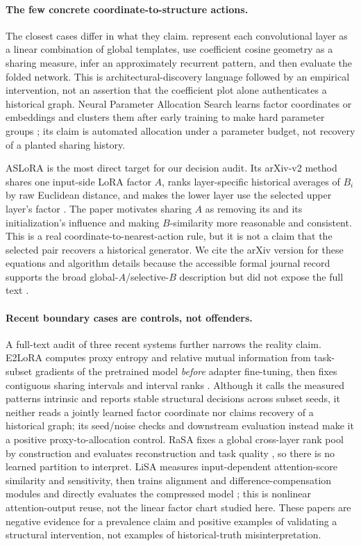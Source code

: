 \paragraph{The few concrete coordinate-to-structure actions.}
The closest cases differ in what they claim.  \citet{savarese2019learning}
represent each convolutional layer as a linear combination of global
templates, use coefficient cosine geometry as a sharing measure, infer an
approximately recurrent pattern, and then evaluate the folded network.  This
is architectural-discovery language followed by an empirical intervention,
not an assertion that the coefficient plot alone authenticates a historical
graph.  Neural Parameter Allocation Search learns factor coordinates or
embeddings and clusters them after early training to make hard parameter
groups \citep{plummer2022neural}; its claim is automated allocation under a
parameter budget, not recovery of a planted sharing history.

ASLoRA is the most direct target for our decision audit.  Its arXiv-v2 method
shares one input-side LoRA factor $A$, ranks layer-specific historical
averages of $B_i$ by raw Euclidean distance, and makes the lower layer use the
selected upper layer's factor \citep{hu2024aslorav2}.  The paper motivates
sharing $A$ as removing its and its initialization's influence and making
$B$-similarity more reasonable and consistent.  This is a real
coordinate-to-nearest-action rule, but it is not a claim that the selected
pair recovers a historical generator.  We cite the arXiv version for these
equations and algorithm details because the accessible formal journal record
supports the broad global-$A$/selective-$B$ description but did not expose
the full text \citep{hu2026aslora}.

\paragraph{Recent boundary cases are controls, not offenders.}
A full-text audit of three recent systems further narrows the reality claim.
E2LoRA computes proxy entropy and relative mutual information from
task-subset gradients of the pretrained model \emph{before} adapter
fine-tuning, then fixes contiguous sharing intervals and interval ranks
\citep{li2026e2lora}.  Although it calls the measured patterns intrinsic and
reports stable structural decisions across subset seeds, it neither reads a
jointly learned factor coordinate nor claims recovery of a historical graph;
its seed/noise checks and downstream evaluation instead make it a positive
proxy-to-allocation control.  RaSA fixes a global cross-layer rank pool by
construction and evaluates reconstruction and task quality
\citep{he2025rasa}, so there is no learned partition to interpret.  LiSA
measures input-dependent attention-score similarity and sensitivity, then
trains alignment and difference-compensation modules and directly evaluates
the compressed model \citep{mu2026lisa}; this is nonlinear attention-output
reuse, not the linear factor chart studied here.  These papers are negative
evidence for a prevalence claim and positive examples of validating a
structural intervention, not examples of historical-truth misinterpretation.


